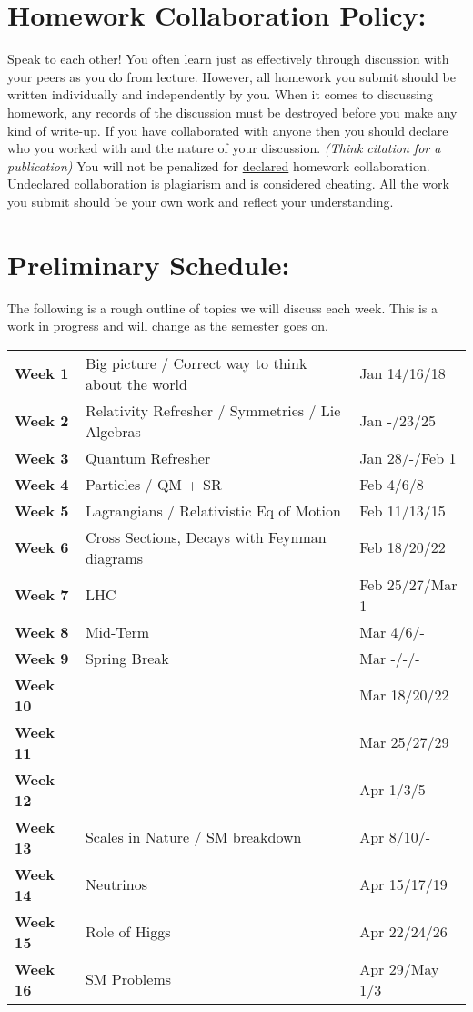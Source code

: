 \documentclass[margin,line]{res}
\begin{document}
\begin{resume}
\section{Homework Collaboration Policy:} 

Speak to each other!
You often learn just as effectively through discussion with your peers as you do from lecture. 
However, all homework you submit should be written individually and independently by you.
When it comes to discussing homework, any records of the discussion must be destroyed before you make any kind of write-up. 
If you have collaborated with anyone then you should declare who you worked with and the nature of your discussion. 
\textit{(Think citation for a publication)}
You will not be penalized for \underline{declared} homework collaboration. 
Undeclared collaboration is plagiarism and is considered cheating. 
All the work you submit should be your own work and reflect your understanding.


\section{Preliminary Schedule:}

The following is a rough outline of topics we will discuss each week. 
This is a work in progress and will change as the semester goes on.

\begin{tabular}{lll}
\textbf{Week 1}  & Big picture / Correct way to think about the world & Jan 14/16/18 \\
\textbf{Week 2}  & Relativity Refresher / Symmetries /  Lie Algebras & Jan -/23/25 \\
\textbf{Week 3}  & Quantum Refresher  & Jan 28/-/Feb 1 \\
\textbf{Week 4}  & Particles / QM + SR & Feb 4/6/8\\
\textbf{Week 5}  & Lagrangians / Relativistic Eq of Motion & Feb 11/13/15\\
\textbf{Week 6}  & Cross Sections, Decays with Feynman diagrams  & Feb 18/20/22\\
\textbf{Week 7}  & LHC  & Feb 25/27/Mar 1\\
\textbf{Week 8}  &  Mid-Term & Mar 4/6/- \\
\textbf{Week 9}  & Spring Break & Mar -/-/-\\
\textbf{Week 10} &  & Mar 18/20/22 \\
\textbf{Week 11} &  & Mar 25/27/29\\
\textbf{Week 12} &  & Apr 1/3/5\\
\textbf{Week 13} & Scales in Nature / SM breakdown & Apr 8/10/-\\
\textbf{Week 14} & Neutrinos & Apr 15/17/19\\
\textbf{Week 15} & Role of Higgs & Apr 22/24/26\\
\textbf{Week 16} & SM Problems  & Apr 29/May 1/3\\
\end{tabular}

\end{resume}
\end{document}
